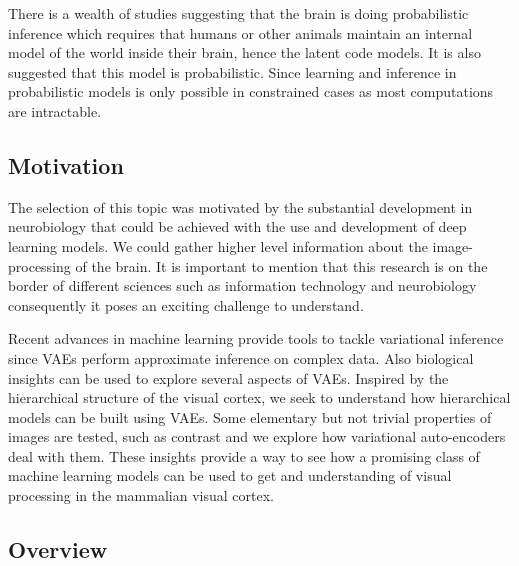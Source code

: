 \documentclass[12pt, english]{article}
\begin{document}
\vspace{4mm}

\par There is a wealth of studies suggesting that the brain is doing probabilistic inference which requires that humans or other animals maintain an internal model of the world inside their brain, hence the latent code models. It is also suggested that this model is probabilistic. Since learning and inference in probabilistic models is only possible in constrained cases as most computations are intractable.

\vspace{7mm}

\subsection{Motivation}

\vspace{7mm}

\par The selection of this topic was motivated by the substantial development in neurobiology that could be achieved with the use and development of deep learning models. We could gather higher level information about the image-processing of the brain. It is important to mention that this research is on the border of different sciences such as information technology and neurobiology consequently it poses an exciting challenge to understand.

\vspace{4mm}

\par Recent advances in machine learning provide tools to tackle variational inference since VAEs perform approximate inference on complex data. Also biological insights can be used to explore several aspects of VAEs. Inspired by the hierarchical structure of the visual cortex, we seek to understand how hierarchical models can be built using VAEs. Some elementary but not trivial properties of images are tested, such as contrast and we explore how variational auto-encoders deal with them. These insights provide a way to see how a promising class of machine learning models can be used to get and understanding of visual processing in the mammalian visual cortex.

\vspace{7mm}

\subsection{Overview}
\end{document}

